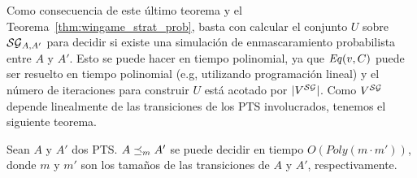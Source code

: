 Como consecuencia de este último teorema y el Teorema~\ref{thm:wingame_strat_prob}, basta con calcular el conjunto $U$
sobre $\mathcal{SG}_{A,A'}$ para decidir si existe una simulación de enmascaramiento probabilista
entre $A$ y $A'$.
%
Esto se puede hacer en tiempo polinomial, ya que $\mathit{Eq}(v,C)$ puede ser resuelto en tiempo polinomial (e.g, utilizando programación lineal) y el número de iteraciones para construir $U$ está acotado por $|V^{\mathcal{SG}}|$.  Como $V^{\mathcal{SG}}$ depende linealmente de las transiciones de los PTS involucrados, tenemos el siguiente teorema.

\begin{theorem}
  Sean $A$ y $A'$ dos PTS.  $A \preceq_{m} A'$ se puede decidir en tiempo 
  $O(\textit{Poly}(m\cdot m'))$, donde $m$ y $m'$ son 
  los tamaños de las transiciones de $A$ y $A'$, respectivamente.
\end{theorem} 






